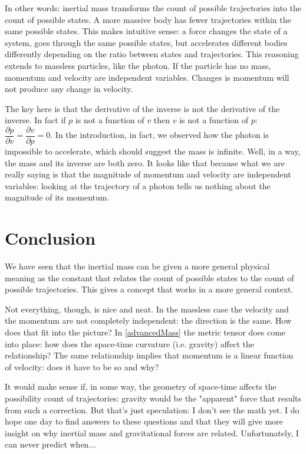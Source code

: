 \documentclass[aps,pra,10pt,floatfix,nofootinbib]{revtex4-1}
\theoremstyle{definition}
\begin{document}
In other words: inertial mass transforms the count of possible trajectories into the count of possible states. A more massive body has fewer trajectories within the same possible states. This makes intuitive sense: a force changes the state of a system, goes through the same possible states, but accelerates different bodies differently depending on the ratio between states and trajectories. This reasoning extends to massless particles, like the photon. If the particle has no mass, momentum and velocity are independent variables. Changes is momentum will not produce any change in velocity.

The key here is that the derivative of the inverse is not the derivative of the inverse. In fact if $p$ is not a function of $v$ then $v$ is not a function of $p$: $\dfrac{\partial p}{\partial v} = \dfrac{\partial v}{\partial p} = 0$. In the introduction, in fact, we observed how the photon is impossible to accelerate, which should suggest the mass is infinite. Well, in a way, the mass and its inverse are both zero. It looks like that because what we are really saying is that the magnitude of momentum and velocity are independent variables: looking at the trajectory of a photon tells us nothing about the magnitude of its momentum.

\section{Conclusion}

We have seen that the inertial mass can be given a more general physical meaning as the constant that relates the count of possible states to the count of possible trajectories. This gives a concept that works in a more general context.

Not everything, though, is nice and neat. In the massless case the velocity and the momentum are not completely independent: the direction is the same. How does that fit into the picture? In \eqref{advancedMass} the metric tensor does come into place: how does the space-time curvature (i.e. gravity) affect the relationship? The same relationship implies that momentum is a linear function of velocity: does it have to be so and why?

It would make sense if, in some way, the geometry of space-time affects the possibility count of trajectories: gravity would be the "apparent" force that results from such a correction. But that's just speculation: I don't see the math yet. I do hope one day to find answers to these questions and that they will give more insight on why inertial mass and gravitational forces are related. Unfortunately, I can never predict when...
\end{document}
